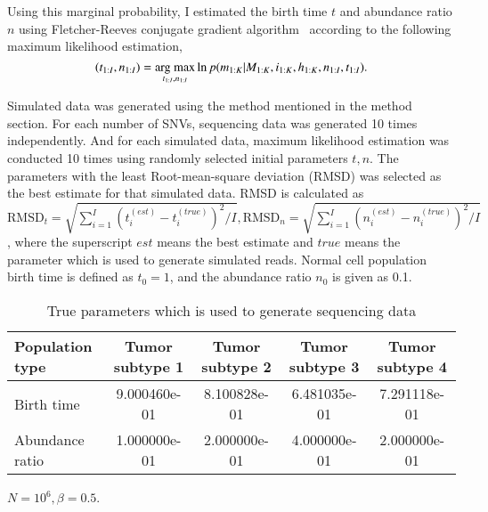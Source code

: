 \documentclass{article}
\begin{document}
Using this marginal probability, I estimated the birth time $t$ and abundance ratio $n$ using Fletcher-Reeves conjugate gradient algorithm~\cite{fletcher1964function} according to the following maximum likelihood estimation,
\begin{equation}
 (t_{1:I}, n_{1:I}) = \mathop{\rm arg~max}\limits_{t_{1:I}, n_{1:I}} \ln p(m_{1:K} | M_{1:K}, i_{1:K}, h_{1:K}, n_{1:I}, t_{1:I}).
\end{equation}

Simulated data was generated using the method mentioned in the method section.%
For each number of SNVs, sequencing data was generated 10 times independently. And for each simulated data, maximum likelihood estimation was conducted 10 times using randomly selected initial parameters $t, n$. The parameters with the least Root-mean-square deviation (RMSD) was selected as the best estimate for that simulated data.
RMSD is calculated as $\mathrm{RMSD}_t = \sqrt{\sum_{i=1}^{I} (t_{i}^{(est)} - t_{i}^{(true)})^2 / I}, \mathrm{RMSD}_n = \sqrt{\sum_{i=1}^{I} (n_{i}^{(est)} - n_{i}^{(true)})^2 / I}$, where the superscript $est$ means the best estimate and $true$ means the parameter which is used to generate simulated reads. Normal cell population birth time is defined as $t_{0}=1$, and the abundance ratio $n_{0}$ is given as 0.1.

\begin{table}[H]
\begin{center}
 \caption{True parameters which is used to generate sequencing data}
 \label{tab: true_parameters_4_2_original}
  \begin{tabular}[t]{lcccc}\toprule
  Population type & Tumor subtype 1 & Tumor subtype 2 & Tumor subtype 3 & Tumor subtype 4\\\midrule
  Birth time & 9.000460e-01 & 8.100828e-01 & 6.481035e-01 & 7.291118e-01\\
  Abundance ratio & 1.000000e-01 & 2.000000e-01 & 4.000000e-01 & 2.000000e-01\\\bottomrule
 \end{tabular}
\end{center}
\end{table}

$N = 10^6, \beta = 0.5$. %
\end{document}
